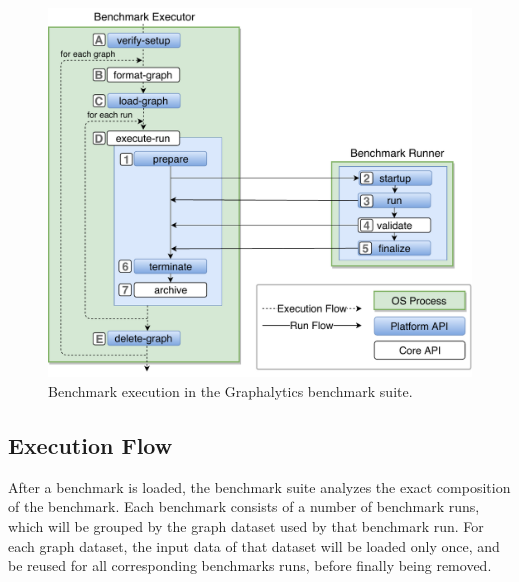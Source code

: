 \begin{figure}[h]
 	\centering
 	\includegraphics[width=0.9\linewidth]{figures/benchmark_process.pdf}
 	\caption{Benchmark execution in the Graphalytics benchmark suite.}
 	\label{fig:benchmark-process}
\end{figure}


\subsection{Execution Flow}
\label{sec:process:execution:exe_flow}
After a benchmark is loaded, the benchmark suite analyzes the exact composition of the benchmark. Each benchmark consists of a number of benchmark runs, which will be grouped by the graph dataset used by that benchmark run. For each graph dataset, the input data of that dataset will be loaded only once, and be reused for all corresponding benchmarks runs, before finally being removed.

